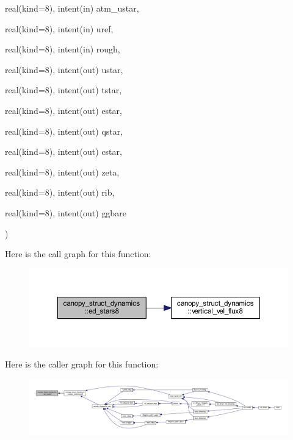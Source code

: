 {\begin{DoxyParamCaption}
\item[{real(kind=8), intent(in)}]{atm\+\_\+ustar, }
\item[{real(kind=8), intent(in)}]{uref, }
\item[{real(kind=8), intent(in)}]{rough, }
\item[{real(kind=8), intent(out)}]{ustar, }
\item[{real(kind=8), intent(out)}]{tstar, }
\item[{real(kind=8), intent(out)}]{estar, }
\item[{real(kind=8), intent(out)}]{qstar, }
\item[{real(kind=8), intent(out)}]{cstar, }
\item[{real(kind=8), intent(out)}]{zeta, }
\item[{real(kind=8), intent(out)}]{rib, }
\item[{real(kind=8), intent(out)}]{ggbare}
\end{DoxyParamCaption}
)}\hypertarget{namespacecanopy__struct__dynamics_a3a475e27ec763919f874021a412cf343}{}\label{namespacecanopy__struct__dynamics_a3a475e27ec763919f874021a412cf343}


Here is the call graph for this function\+:\nopagebreak
\begin{figure}[H]
\begin{center}
\leavevmode
\includegraphics[width=350pt]{namespacecanopy__struct__dynamics_a3a475e27ec763919f874021a412cf343_cgraph}
\end{center}
\end{figure}




Here is the caller graph for this function\+:\nopagebreak
\begin{figure}[H]
\begin{center}
\leavevmode
\includegraphics[width=350pt]{namespacecanopy__struct__dynamics_a3a475e27ec763919f874021a412cf343_icgraph}
\end{center}
\end{figure}


